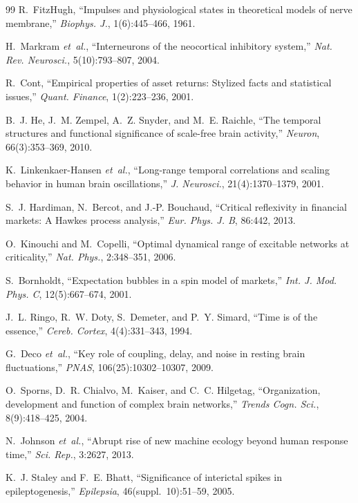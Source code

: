 \documentclass[12pt,twocolumn]{ltjsarticle}
\begin{document}
\begin{thebibliography}{99}
R.~FitzHugh,
``Impulses and physiological states in theoretical models
of nerve membrane,''
\textit{Biophys. J.}, 1(6):445--466, 1961.

H.~Markram \textit{et~al.},
``Interneurons of the neocortical inhibitory system,''
\textit{Nat. Rev. Neurosci.}, 5(10):793--807, 2004.

R.~Cont,
``Empirical properties of asset returns: Stylized facts
and statistical issues,''
\textit{Quant. Finance}, 1(2):223--236, 2001.

B.~J. He, J.~M. Zempel, A.~Z. Snyder, and M.~E. Raichle,
``The temporal structures and functional significance
of scale-free brain activity,''
\textit{Neuron}, 66(3):353--369, 2010.

K.~Linkenkaer-Hansen \textit{et~al.},
``Long-range temporal correlations and scaling behavior
in human brain oscillations,''
\textit{J. Neurosci.}, 21(4):1370--1379, 2001.

S.~J. Hardiman, N.~Bercot, and J.-P. Bouchaud,
``Critical reflexivity in financial markets:
A Hawkes process analysis,''
\textit{Eur. Phys. J. B}, 86:442, 2013.

O.~Kinouchi and M.~Copelli,
``Optimal dynamical range of excitable networks at criticality,''
\textit{Nat. Phys.}, 2:348--351, 2006.

S.~Bornholdt,
``Expectation bubbles in a spin model of markets,''
\textit{Int. J. Mod. Phys. C}, 12(5):667--674, 2001.

J.~L. Ringo, R.~W. Doty, S.~Demeter, and P.~Y. Simard,
``Time is of the essence,''
\textit{Cereb. Cortex}, 4(4):331--343, 1994.

G.~Deco \textit{et~al.},
``Key role of coupling, delay, and noise in resting brain fluctuations,''
\textit{PNAS}, 106(25):10302--10307, 2009.

O.~Sporns, D.~R. Chialvo, M.~Kaiser, and C.~C. Hilgetag,
``Organization, development and function of complex brain networks,''
\textit{Trends Cogn. Sci.}, 8(9):418--425, 2004.

N.~Johnson \textit{et~al.},
``Abrupt rise of new machine ecology beyond human response time,''
\textit{Sci. Rep.}, 3:2627, 2013.

K.~J. Staley and F.~E. Bhatt,
``Significance of interictal spikes in epileptogenesis,''
\textit{Epilepsia}, 46(suppl.~10):51--59, 2005.


\end{thebibliography}
\end{document}
